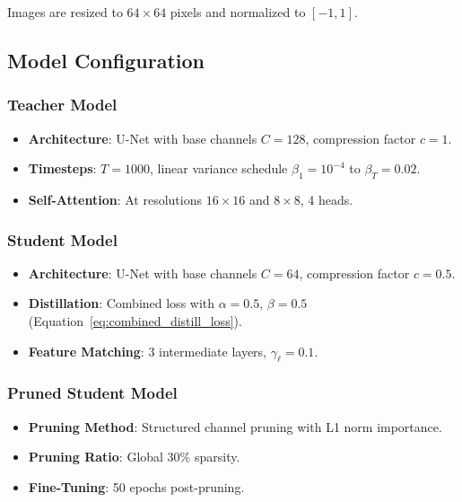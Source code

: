 \documentclass[12pt]{report}
\theoremstyle{definition}
\begin{document}
Images are resized to $64 \times 64$ pixels and normalized to $[-1, 1]$.

\subsection{Model Configuration}

\subsubsection{Teacher Model}

\begin{itemize}
\item \textbf{Architecture}: U-Net with base channels $C = 128$, compression factor $c = 1$.
\item \textbf{Timesteps}: $T = 1000$, linear variance schedule $\beta_1 = 10^{-4}$ to $\beta_T = 0.02$.
\item \textbf{Self-Attention}: At resolutions $16 \times 16$ and $8 \times 8$, 4 heads.
\end{itemize}

\subsubsection{Student Model}

\begin{itemize}
\item \textbf{Architecture}: U-Net with base channels $C = 64$, compression factor $c = 0.5$.
\item \textbf{Distillation}: Combined loss with $\alpha = 0.5$, $\beta = 0.5$ (Equation~\ref{eq:combined_distill_loss}).
\item \textbf{Feature Matching}: 3 intermediate layers, $\gamma_\ell = 0.1$.
\end{itemize}

\subsubsection{Pruned Student Model}

\begin{itemize}
\item \textbf{Pruning Method}: Structured channel pruning with L1 norm importance.
\item \textbf{Pruning Ratio}: Global 30\% sparsity.
\item \textbf{Fine-Tuning}: 50 epochs post-pruning.
\end{itemize}
\end{document}

